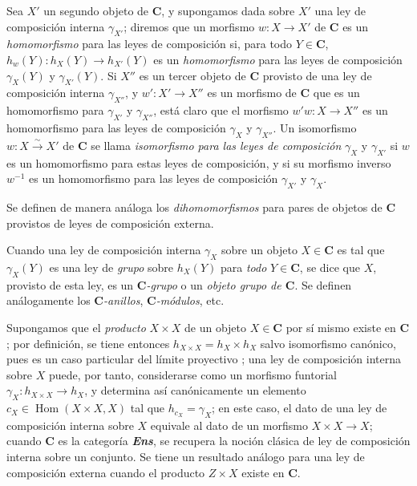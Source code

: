 \begin{env}[8.2.2]
\label{0.8.2.2}
\label{0.8.2.2-fr}
Sea $X'$ un segundo objeto de $\boldsymbol{C}$, y supongamos dada sobre $X'$ una ley de composición interna $\gamma_{X'}$; diremos que un morfismo
$w:X\to X'$ de $\boldsymbol{C}$ es un \emph{homomorfismo} para las leyes de composición si, para todo $Y\in\boldsymbol{C}$, $h_w(Y):h_X(Y)\to h_{X'}(Y)$ es un \emph{homomorfismo} para las leyes de composición $\gamma_X(Y)$ y $\gamma_{X'}(Y)$.
Si $X''$ es un tercer
objeto de $\boldsymbol{C}$ provisto de una ley de composición interna $\gamma_{X''}$, y $w':X'\to X''$ es un morfismo de $\boldsymbol{C}$ que es un homomorfismo para $\gamma_{X'}$ y $\gamma_{X''}$, está claro que el morfismo $w'w:X\to X''$ es un homomorfismo para las leyes de composición $\gamma_X$ y $\gamma_{X''}$.
Un isomorfismo $w:X\xrightarrow{\sim}X'$ de $\boldsymbol{C}$ se llama \emph{isomorfismo para las leyes de composición} $\gamma_X$ y $\gamma_{X'}$ si $w$ es un homomorfismo para estas leyes de composición, y si su morfismo inverso $w^{-1}$ es un homomorfismo para las leyes de composición $\gamma_{X'}$ y $\gamma_X$.

Se definen de manera análoga los \emph{dihomomorfismos} para pares de objetos de $\boldsymbol{C}$ provistos de leyes de composición externa.
\end{env}

\begin{env}[8.2.3]
\label{0.8.2.3}
\label{0.8.2.3-fr}
Cuando una ley de composición interna $\gamma_X$ sobre un objeto $X\in \boldsymbol{C}$ es tal que $\gamma_X(Y)$ es una ley de \emph{grupo} sobre $h_X(Y)$ para \emph{todo} $Y\in \boldsymbol{C}$, se dice que $X$, provisto de esta ley, es un \emph{$\boldsymbol{C}$-grupo} o un \emph{objeto grupo de $\boldsymbol{C}$}.
Se definen análogamente los \emph{$\boldsymbol{C}$-anillos}, \emph{$\boldsymbol{C}$-módulos}, etc.
\end{env}

\begin{env}[8.2.4]
\label{0.8.2.4}
\label{0.8.2.4-fr}
Supongamos que el \emph{producto} $X\times X$ de un objeto $X\in \boldsymbol{C}$ por sí mismo existe en $\boldsymbol{C}$; por definición, se tiene entonces $h_{X\times X}=h_X\times h_X$ salvo isomorfismo canónico, pues es un caso particular del límite proyectivo ; una ley de composición interna sobre $X$ puede, por tanto, considerarse como un morfismo funtorial $\gamma_X:h_{X\times X}\to h_X$, y determina así canónicamente  un elemento $c_X\in\operatorname{Hom}(X\times X,X)$ tal que $h_{c_X}=\gamma_X$; en este caso, el dato de una ley de composición interna sobre $X$ equivale al dato de un morfismo $X\times X\to X$; cuando $\boldsymbol{C}$ es la categoría \textbf{\textit{Ens}}, se recupera la noción clásica de ley de composición interna sobre un conjunto. Se tiene un resultado análogo para una ley de composición externa cuando el producto $Z\times X$ existe en $\boldsymbol{C}$.
\end{env}

